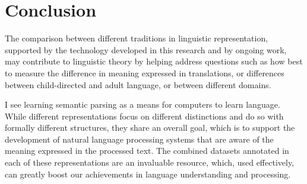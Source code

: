 \documentclass[12pt,a4paper,table]{report}
\newcommand{\heb}[1]{\bgroup\textdir TRT\hebfont #1\egroup}
\begin{document}
\section{Conclusion}

The comparison between different traditions in linguistic representation,
supported by the technology developed in this research
and by ongoing work,
may contribute to linguistic theory by helping address questions such as
how best to measure the difference in meaning expressed in translations,
or differences between child-directed and adult language,
or between different domains.

I see learning semantic parsing as a means for computers to learn language.
While different representations focus on different distinctions and do so
with formally different structures, they share an overall goal,
which is to support the development of natural language processing systems
that are aware of the meaning expressed in the processed text.
The combined datasets annotated in each of these representations are an invaluable
resource, which, used effectively, can greatly boost our achievements in
language understanding and processing.

{\small}


\pagebreak
\appendix





\pagebreak

\section*{\flushright{\heb{תקציר}}}
\end{document}
